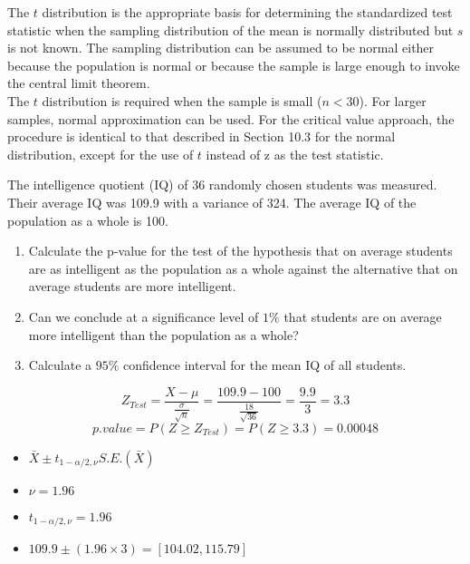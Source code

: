 \begin{frame}


The $t$ distribution is the appropriate basis for
determining the standardized test statistic when the sampling
distribution of the mean is normally distributed but $s$ is not
known. The sampling distribution can be assumed to be normal
either because the population is normal or because the sample is
large enough to invoke the central limit theorem. \\ The $t$
distribution is required when the sample is small ($n < 30$). For
larger samples, normal approximation can be used. For the critical
value approach, the procedure is identical to that described in
Section 10.3 for the normal distribution, except for the use of $t$
instead of z as the test statistic.
\end{frame}
\begin{frame}
The intelligence quotient (IQ) of 36 randomly chosen students was measured.
Their average IQ was 109.9 with a variance of 324.
The average IQ of the population as a whole is 100.
\begin{enumerate}
\item Calculate the p-value for the test of the hypothesis that on average
students are as intelligent as the population as a whole against the alternative that on average students are more intelligent.
\item Can we conclude at a significance level of $1\%$ that students are on average more intelligent than the population as a whole?
\item Calculate a $95\%$ confidence interval for the mean IQ of all students.
\end{enumerate}
\[Z_{Test} = \frac{X- \mu}{\frac{\sigma}{\sqrt{n}}} = \frac{109.9 - 100}{\frac{18}{\sqrt{36}}} = \frac{9.9}{3} = 3.3\]
\[p.value = P(Z \geq Z_{Test}) = P(Z \geq 3.3) = 0.00048\]
\end{frame}
\begin{frame}
\begin{itemize}
\item $\bar{X} \pm t_{1-\alpha/2,\nu}S.E.(\bar{X})$
\item $\nu = 1.96$
\item $t_{1-\alpha/2,\nu} = 1.96$
\item $109.9 \pm (1.96 \times 3) = [104.02, 115.79]$
\end{itemize}
\end{frame}
